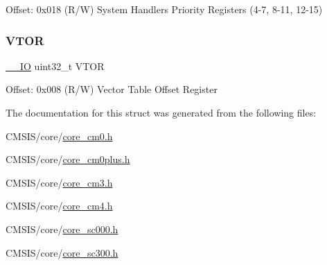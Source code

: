 Offset\+: 0x018 (R/W) System Handlers Priority Registers (4-\/7, 8-\/11, 12-\/15) \mbox{\label{struct_s_c_b___type_aaf388a921a016cae590cfcf1e43b1cdf}} 
\subsubsection{\texorpdfstring{VTOR}{VTOR}}
{\footnotesize\ttfamily \mbox{\hyperlink{core__sc300_8h_aec43007d9998a0a0e01faede4133d6be}{\+\_\+\+\_\+\+IO}} uint32\+\_\+t V\+T\+OR}

Offset\+: 0x008 (R/W) Vector Table Offset Register 

The documentation for this struct was generated from the following files\+:\begin{DoxyCompactItemize}
\item 
C\+M\+S\+I\+S/core/\mbox{\hyperlink{core__cm0_8h}{core\+\_\+cm0.\+h}}\item 
C\+M\+S\+I\+S/core/\mbox{\hyperlink{core__cm0plus_8h}{core\+\_\+cm0plus.\+h}}\item 
C\+M\+S\+I\+S/core/\mbox{\hyperlink{core__cm3_8h}{core\+\_\+cm3.\+h}}\item 
C\+M\+S\+I\+S/core/\mbox{\hyperlink{core__cm4_8h}{core\+\_\+cm4.\+h}}\item 
C\+M\+S\+I\+S/core/\mbox{\hyperlink{core__sc000_8h}{core\+\_\+sc000.\+h}}\item 
C\+M\+S\+I\+S/core/\mbox{\hyperlink{core__sc300_8h}{core\+\_\+sc300.\+h}}\end{DoxyCompactItemize}
